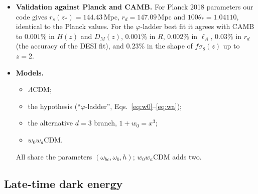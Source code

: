 \documentclass[11pt]{article}
\theoremstyle{definition}
\theoremstyle{remark}
\newcommand{\gr}{\varphi}
\newcommand{\LCDM}{$\Lambda$CDM}
\begin{document}
\begin{itemize}
\item \textbf{Validation against Planck and CAMB.} For Planck 2018 parameters our code gives $r_s(z_*) = 144.43$\,Mpc, $r_d = 147.09$\,Mpc and $100\theta_* = 1.04110$, identical to the Planck values. For the $\gr$-ladder best fit it agrees with CAMB to $0.001\%$ in $H(z)$ and $D_M(z)$, $0.001\%$ in $R$, $0.002\%$ in $\ell_A$, $0.03\%$ in $r_d$ (the accuracy of the DESI fit), and $0.23\%$ in the shape of $f\sigma_8(z)$ up to $z = 2$.
\item \textbf{Models.}
  \begin{itemize}
  \item \LCDM;
  \item the hypothesis (``$\gr$-ladder'', Eqs.~\eqref{eq:w0}--\eqref{eq:wa});
  \item the alternative $d = 3$ branch, $1 + w_0 = x^3$;
  \item $w_0w_a$CDM.
  \end{itemize}
  All share the parameters $(\omega_{bc}, \omega_b, h)$; $w_0w_a$CDM adds two.
\end{itemize}

\subsection{Late-time dark energy}
\end{document}
